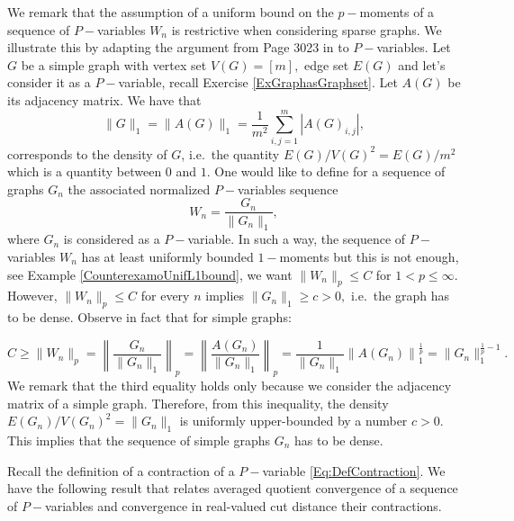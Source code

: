 \documentclass[11pt]{article}
\begin{document}
We remark that the assumption of a uniform bound on the $p-$moments of a sequence of $P-$variables $W_n$ is restrictive when considering sparse graphs. We illustrate this by adapting the argument from Page 3023 in \cite{LpGraphons1} to $P-$variables. 
Let $G$ be a simple graph  with vertex set $V(G)=[m],$ edge set $E(G)$ and let's consider it as a $P-$variable, recall Exercise \ref{ExGraphasGraphset}. Let $A(G)$ be its adjacency matrix.
We have that 
$$
\|G\|_{1}=\|A(G)\|_{1}=\frac{1}{m^2}\sum^m_{i,j=1}|A(G)_{i,j}|,%
$$
corresponds to the density of $G$, i.e.\ the quantity $E(G)/V(G)^2=E(G)/m^2$ which is a quantity between $0$ and $1.$ One would like to define for a sequence of graphs $G_n$ the associated normalized $P-$variables sequence 
\begin{equation}\label{Eq:PsetFromNormAdjac}
W_n=\frac{G_n}{\|G_n\|_{1}},
\end{equation}
where $G_n$ is considered as a $P-$variable.
In such a way, the sequence of $P-$variables $W_n$ has at least uniformly bounded $1-$moments but this is not enough, see Example \ref{CounterexamoUnifL1bound}, we want $\|W_n\|_p\leq C$ for $1<p\leq \infty.$
However, $\|W_n\|_p\leq C$ for every $n$ implies $\|G_n\|_{1}\geq c>0,$ i.e.\ the graph has to be dense. Observe in fact that for simple graphs:

$$
C\geq\|W_n\|_p=\left\|\frac{G_n}{\|G_n\|_{1}}\right\|_p=\left\|\frac{A(G_n)}{\|G_n\|_{1}}\right\|_p=\frac{1}{\|G_n\|_{1}}\left\|A(G_n)\right\|^{\frac{1}{p}}_1=\|G_n\|^{\frac{1}{p}-1}_{1}.
$$
We remark that the third equality holds only because we consider the adjacency matrix of a simple graph.
Therefore, from this inequality, the density $E(G_n)/V(G_n)^2=\|G_n\|_{1}$ is uniformly upper-bounded by a number $c>0.$ This implies that the sequence of simple graphs $G_n$ has to be dense. 

Recall the definition of a contraction of a $P-$variable \eqref{Eq:DefContraction}. We have the following result that relates averaged quotient convergence of a sequence of $P-$variables and convergence in real-valued cut distance their contractions.
\end{document}
